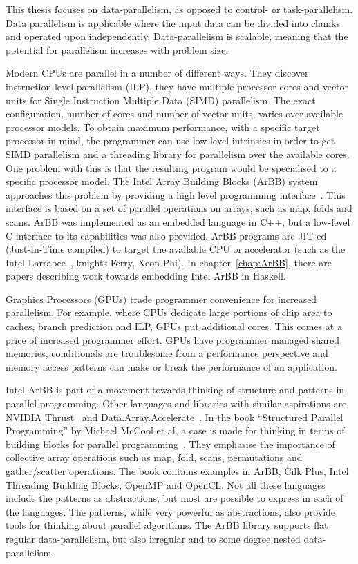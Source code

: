 \documentclass[a4paper]{book}
\begin{document}
This thesis focuses on data-parallelism, as opposed to control- or 
task-parallelism. Data parallelism is applicable where the input data can 
be divided into chunks and operated upon independently. Data-parallelism is scalable,
meaning that the potential for parallelism increases with problem size. 

Modern CPUs are parallel in a number of different ways. They discover instruction
level parallelism (ILP), they have multiple processor cores and vector units for 
Single Instruction Multiple Data (SIMD)  parallelism. The exact configuration, number
of cores and number of vector units, varies over available processor models. 
To obtain maximum performance, with a specific target processor in mind, the programmer
can use low-level intrinsics in order to get SIMD parallelism and a threading library
for parallelism over the available cores. One problem with this is that the resulting program 
would be specialised to a specific processor model. The Intel Array Building Blocks (ArBB) 
system approaches this problem by providing a high level programming interface~\citet{ARBB2011}.
This interface is based on a set of parallel operations on arrays, such as map, folds 
and scans. ArBB was implemented as an embedded language in C++, but a low-level C interface to 
its capabilities was also provided. ArBB programs are JIT-ed (Just-In-Time compiled) to 
target the available CPU or accelerator (such as the Intel Larrabee~\citet{Larrabee}, 
knights Ferry, Xeon Phi). In chapter~\ref{chap:ArBB}, there are papers describing work 
towards embedding Intel ArBB in Haskell. 

Graphics Processors (GPUs) trade programmer convenience for increased parallelism. 
For example, where CPUs dedicate large portions of chip area to caches, branch prediction and 
ILP, GPUs put additional cores. This comes at a price of increased programmer effort.
GPUs have programmer managed shared memories, conditionals are troublesome from a performance 
perspective and memory access patterns can make or break the performance of an 
application.  

Intel ArBB is part of a movement towards thinking of structure and patterns in 
parallel programming. Other languages and libraries with similar aspirations 
are NVIDIA Thrust~\citet{THRUST} and Data.Array.Accelerate~\citet{ACCELERATEDAMP11}.
In the book ``Structured Parallel Programming'' by Michael McCool et al, a case is 
made for thinking in terms of building blocks for parallel programming~\citet{STRUCTURED}. 
They emphasise the importance of collective array operations such as map, fold, scans, 
permutations and gather/scatter operations. The book contains examples in ArBB, Cilk Plus, 
Intel Threading Building Blocks, OpenMP and OpenCL. Not all these languages include 
the patterns as abstractions, but most are possible to express in each of the languages. 
The patterns, while very powerful as abstractions, also provide tools for thinking about 
parallel algorithms. The ArBB library supports flat regular data-parallelism, but also 
irregular and to some degree nested data-parallelism. 
\end{document}
